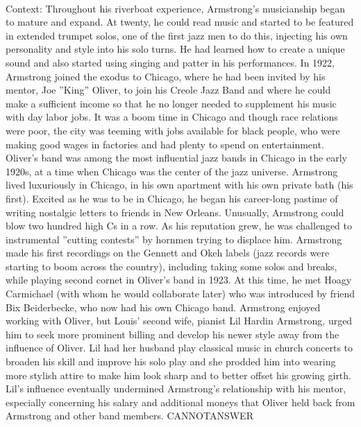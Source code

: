 \documentclass[11pt,a4paper, onecolumn]{article}
\begin{document}
\\ Context: Throughout his riverboat experience, Armstrong's musicianship began to mature and expand. At twenty, he could read music and started to be featured in extended trumpet solos, one of the first jazz men to do this, injecting his own personality and style into his solo turns. He had learned how to create a unique sound and also started using singing and patter in his performances. In 1922, Armstrong joined the exodus to Chicago, where he had been invited by his mentor, Joe ''King'' Oliver, to join his Creole Jazz Band and where he could make a sufficient income so that he no longer needed to supplement his music with day labor jobs. It was a boom time in Chicago and though race relations were poor, the city was teeming with jobs available for black people, who were making good wages in factories and had plenty to spend on entertainment. Oliver's band was among the most influential jazz bands in Chicago in the early 1920s, at a time when Chicago was the center of the jazz universe. Armstrong lived luxuriously in Chicago, in his own apartment with his own private bath (his first). Excited as he was to be in Chicago, he began his career-long pastime of writing nostalgic letters to friends in New Orleans. Unusually, Armstrong could blow two hundred high Cs in a row. As his reputation grew, he was challenged to instrumental ''cutting contests'' by hornmen trying to displace him. Armstrong made his first recordings on the Gennett and Okeh labels (jazz records were starting to boom across the country), including taking some solos and breaks, while playing second cornet in Oliver's band in 1923. At this time, he met Hoagy Carmichael (with whom he would collaborate later) who was introduced by friend Bix Beiderbecke, who now had his own Chicago band. Armstrong enjoyed working with Oliver, but Louis' second wife, pianist Lil Hardin Armstrong, urged him to seek more prominent billing and develop his newer style away from the influence of Oliver. Lil had her husband play classical music in church concerts to broaden his skill and improve his solo play and she prodded him into wearing more stylish attire to make him look sharp and to better offset his growing girth. Lil's influence eventually undermined Armstrong's relationship with his mentor, especially concerning his salary and additional moneys that Oliver held back from Armstrong and other band members. CANNOTANSWER
\end{document}
